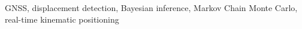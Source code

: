 \documentclass[journal]{IEEEtran}
\begin{document}
	\begin{IEEEkeywords}
		GNSS, displacement detection, Bayesian inference, Markov Chain Monte Carlo, real-time kinematic positioning
	\end{IEEEkeywords}
	
	
	
	
	
	
	\IEEEpeerreviewmaketitle
	
	
	
\end{document}
